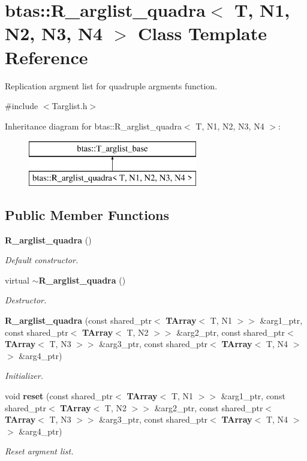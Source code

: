 \section{btas\-:\-:R\-\_\-arglist\-\_\-quadra$<$ T, N1, N2, N3, N4 $>$ Class Template Reference}
\label{d4/dec/classbtas_1_1R__arglist__quadra}


Replication argment list for quadruple argments function.  




{\ttfamily \#include $<$Targlist.\-h$>$}

Inheritance diagram for btas\-:\-:R\-\_\-arglist\-\_\-quadra$<$ T, N1, N2, N3, N4 $>$\-:\begin{figure}[H]
\begin{center}
\leavevmode
\includegraphics[height=2.000000cm]{d4/dec/classbtas_1_1R__arglist__quadra}
\end{center}
\end{figure}
\subsection*{Public Member Functions}
\begin{DoxyCompactItemize}
\item 
{\bf R\-\_\-arglist\-\_\-quadra} ()
\begin{DoxyCompactList}\small\item\em Default constructor. \end{DoxyCompactList}\item 
virtual {\bf $\sim$\-R\-\_\-arglist\-\_\-quadra} ()
\begin{DoxyCompactList}\small\item\em Destructor. \end{DoxyCompactList}\item 
{\bf R\-\_\-arglist\-\_\-quadra} (const shared\-\_\-ptr$<$ {\bf T\-Array}$<$ T, N1 $>$$>$ \&arg1\-\_\-ptr, const shared\-\_\-ptr$<$ {\bf T\-Array}$<$ T, N2 $>$$>$ \&arg2\-\_\-ptr, const shared\-\_\-ptr$<$ {\bf T\-Array}$<$ T, N3 $>$$>$ \&arg3\-\_\-ptr, const shared\-\_\-ptr$<$ {\bf T\-Array}$<$ T, N4 $>$$>$ \&arg4\-\_\-ptr)
\begin{DoxyCompactList}\small\item\em Initializer. \end{DoxyCompactList}\item 
void {\bf reset} (const shared\-\_\-ptr$<$ {\bf T\-Array}$<$ T, N1 $>$$>$ \&arg1\-\_\-ptr, const shared\-\_\-ptr$<$ {\bf T\-Array}$<$ T, N2 $>$$>$ \&arg2\-\_\-ptr, const shared\-\_\-ptr$<$ {\bf T\-Array}$<$ T, N3 $>$$>$ \&arg3\-\_\-ptr, const shared\-\_\-ptr$<$ {\bf T\-Array}$<$ T, N4 $>$$>$ \&arg4\-\_\-ptr)
\begin{DoxyCompactList}\small\item\em Reset argment list. \end{DoxyCompactList}\end{DoxyCompactItemize}
